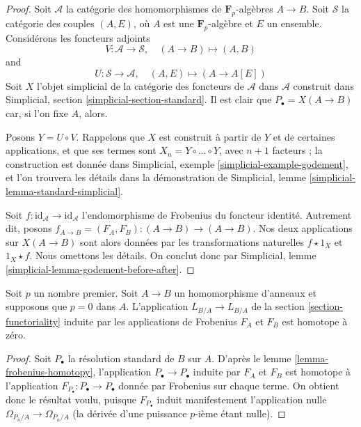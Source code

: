 \begin{proof}
Soit $\mathcal{A}$ la catégorie des homomorphismes de $\mathbf{F}_p$-algèbres
$A \to B$. Soit $\mathcal{S}$ la catégorie des couples $(A, E)$, où $A$ est
une $\mathbf{F}_p$-algèbre et $E$ un ensemble. Considérons les foncteurs
adjoints
$$
V : \mathcal{A} \to \mathcal{S}, \quad (A \to B) \mapsto (A, B)
$$
and
$$
U : \mathcal{S} \to \mathcal{A}, \quad (A, E) \mapsto (A \to A[E])
$$
Soit $X$ l'objet simplicial de la catégorie des foncteurs de $\mathcal{A}$
dans $\mathcal{A}$ construit dans Simplicial, section
\ref{simplicial-section-standard}. Il est clair que
$P_\bullet = X(A \to B)$ car, si l'on fixe $A$, alors.

\medskip\noindent
Posons $Y = U \circ V$. Rappelons que $X$ est construit à partir de $Y$ et de
certaines applications, et que ses termes sont
$X_n = Y \circ \ldots \circ Y$, avec $n + 1$ facteurs ; la construction est
donnée dans Simplicial, exemple \ref{simplicial-example-godement}, et l'on
trouvera les détails dans la démonstration de Simplicial, lemme
\ref{simplicial-lemma-standard-simplicial}.

\medskip\noindent
Soit $f : \text{id}_\mathcal{A} \to \text{id}_\mathcal{A}$ l'endomorphisme de
Frobenius du foncteur identité. Autrement dit, posons
$f_{A \to B} = (F_A, F_B) : (A \to B) \to (A \to B)$. Nos deux applications
sur $X(A \to B)$ sont alors données par les transformations naturelles
$f \star 1_X$ et $1_X \star f$. Nous omettons les détails. On conclut donc par
Simplicial, lemme \ref{simplicial-lemma-godement-before-after}.
\end{proof}

\begin{lemma}
\label{lemma-frobenius-acts-as-zero}
Soit $p$ un nombre premier. Soit $A \to B$ un homomorphisme d'anneaux et
supposons que $p = 0$ dans $A$. L'application $L_{B/A} \to L_{B/A}$ de la
section \ref{section-functoriality} induite par les applications de Frobenius
$F_A$ et $F_B$ est homotope à zéro.
\end{lemma}

\begin{proof}
Soit $P_\bullet$ la résolution standard de $B$ sur $A$. D'après le lemme
\ref{lemma-frobenius-homotopy}, l'application $P_\bullet \to P_\bullet$ induite
par $F_A$ et $F_B$ est homotope à l'application
$F_{P_\bullet} : P_\bullet \to P_\bullet$ donnée par Frobenius sur chaque
terme. On obtient donc le résultat voulu, puisque $F_{P_\bullet}$ induit
manifestement l'application nulle $\Omega_{P_n/A} \to \Omega_{P_n/A}$ (la
dérivée d'une puissance $p$-ième étant nulle).
\end{proof}

